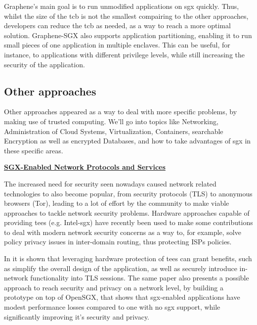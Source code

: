 Graphene's main goal is to run unmodified applications on \gls{sgx} quickly. Thus, whilst the size of the \gls{tcb} is not the smallest compairing to the other approaches, developers can reduce the \gls{tcb} as needed, as a way to reach a more optimal solution. 
Graphene-SGX also supports application partitioning, enabling it to run small pieces of one application in multiple enclaves. This can be useful, for instance, to applications with different privilege levels, while still increasing the security of the application.
\subsection{Other approaches}
\label{ssec:otherSGXFrameworks}



Other approaches appeared as a way to deal with more specific problems, by making use of trusted computing. We'll go into topics like Networking, Administration of Cloud Systems, Virtualization, Containers, searchable Encryption as well as encrypted Databases, and how to take advantages of \gls{sgx} in these specific areas. \newline


\underline{\textbf{SGX-Enabled Network Protocols and Services}}


The increased need for security seen nowadays caused network related technologies to also become popular, from security protocols (TLS) to anonymous browsers (Tor), leading to a lot of effort by the community to make viable approaches to tackle network security problems. 
Hardware approaches capable of providing \gls{tee}s (e.g. Intel-\gls{sgx}) have recently been used to make some contributions to deal with modern network security concerns as a way to, for example, solve policy privacy issues in inter-domain routing, thus protecting ISPs policies.

In \cite{torSGXPaper} it is shown that leveraging hardware protection of \gls{tee}s can grant benefits, such as simplify the overall design of the application, as well as securely introduce in-network functionality into TLS sessions. The same paper also presents a possible approach to reach security and privacy on a network level, by building a prototype on top of OpenSGX, that shows that \gls{sgx}-enabled applications have modest performance losses compared to one with no \gls{sgx} support, while significantly improving it’s security and privacy.

